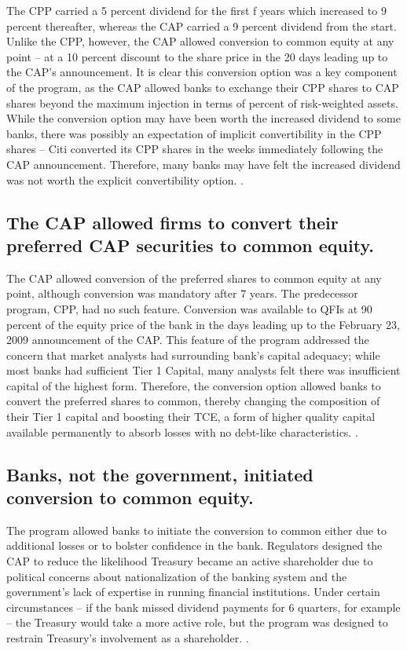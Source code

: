 \documentclass[12pt]{article}
\begin{document}
The CPP carried a 5 percent dividend for the first f years which increased to 9 percent thereafter, whereas the CAP carried a 9 percent dividend from the start. Unlike the CPP, however, the CAP allowed conversion to common equity at any point -- at a 10 percent discount to the share price in the 20 days leading up to the CAP's announcement. It is clear this conversion option was a key component of the program, as the CAP allowed banks to exchange their CPP shares to CAP shares beyond the maximum injection in terms of percent of risk-weighted assets. While the conversion option may have been worth the increased dividend to some banks, there was possibly an expectation of implicit convertibility in the CPP shares -- Citi converted its CPP shares in the weeks immediately following the CAP announcement. Therefore, many banks may have felt the increased dividend was not worth the explicit convertibility option. \citep{GW}.

\subsection{The CAP allowed firms to convert their preferred CAP securities to common equity.}

The CAP allowed conversion of the preferred shares to common equity at any point, although conversion was mandatory after 7 years. The predecessor program, CPP, had no such feature. Conversion was available to QFIs at 90 percent of the equity price of the bank in the days leading up to the February 23, 2009 announcement of the CAP. This feature of the program addressed the concern that market analysts had surrounding bank's capital adequacy; while most banks had sufficient Tier 1 Capital, many analysts felt there was insufficient capital of the highest form. Therefore, the conversion option allowed banks to convert the preferred shares to common, thereby changing the composition of their Tier 1 capital and boosting their TCE, a form of higher quality capital available permanently to absorb losses with no debt-like characteristics. \citep{WhitePaper}.

\subsection{Banks, not the government, initiated conversion to common equity.}

The program allowed banks to initiate the conversion to common either due to additional losses or to bolster confidence in the bank. Regulators designed the CAP to reduce the likelihood Treasury became an active shareholder due to political concerns about nationalization of the banking system and the government's lack of expertise in running financial institutions. Under certain circumstances -- if the bank missed dividend payments for 6 quarters, for example -- the Treasury would take a more active role, but the program was designed to restrain Treasury's involvement as a shareholder. \citep{GW}.
\end{document}
